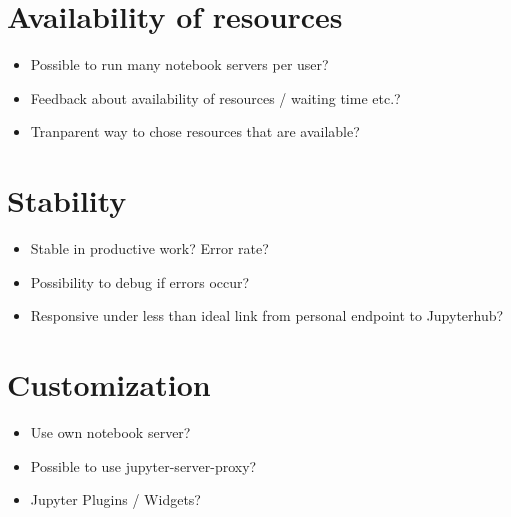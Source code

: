 \documentclass[11pt,a4paper]{article}
\begin{document}


\section{Availability of resources}
\label{s-availability-resources}

\begin{itemize}
  \item Possible to run many notebook servers per user?
  \item Feedback about availability of resources / waiting time etc.?
  \item Tranparent way to chose resources that are available?
\end{itemize}


\section{Stability}
\label{s-stability}

\begin{itemize}
	\item Stable in productive work? Error rate?
  \item Possibility to debug if errors occur?
  \item Responsive under less than ideal link from personal endpoint to Jupyterhub?
\end{itemize}


\section{Customization}
\label{s-customization}

\begin{itemize}
	\item Use own notebook server?
  \item Possible to use jupyter-server-proxy?
  \item Jupyter Plugins / Widgets?
\end{itemize}
\end{document}

